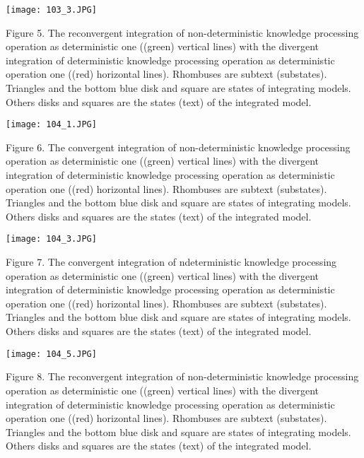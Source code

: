 \documentclass{article}
\begin{document}
\begin{multicols}{2}
\begin{center}
\texttt{[image: 103\_3.JPG]}
\end{center}

\scriptsize Figure 5. The reconvergent integration of non-deterministic knowledge
processing operation as deterministic one ((green) vertical lines) with the
divergent integration of deterministic knowledge processing operation
as deterministic operation one ((red) horizontal lines). Rhombuses are
subtext (substates). Triangles and the bottom blue disk and square are
states of integrating models. Others disks and squares are the states
(text) of the integrated model.


\begin{center}
\texttt{[image: 104\_1.JPG]} 
\end{center}
\vspace{0.5pt}
\scriptsize Figure 6. The convergent integration of non-deterministic knowledge
processing operation as deterministic one ((green) vertical lines) with the
divergent integration of deterministic knowledge processing operation
as deterministic operation one ((red) horizontal lines). Rhombuses are
subtext (substates). Triangles and the bottom blue disk and square are
states of integrating models. Others disks and squares are the states
(text) of the integrated model.

\begin{center}
\texttt{[image: 104\_3.JPG]}
\end{center}
\vspace{0.5pt}
\scriptsize Figure 7. The convergent integration of ndeterministic knowledge
processing operation as deterministic one ((green) vertical lines) with the
divergent integration of deterministic knowledge processing operation
as deterministic operation one ((red) horizontal lines). Rhombuses are
subtext (substates). Triangles and the bottom blue disk and square are
states of integrating models. Others disks and squares are the states
(text) of the integrated model.

\begin{center}
\texttt{[image: 104\_5.JPG]}
\end{center}
\vspace{0.5pt}
\scriptsize Figure 8. The reconvergent integration of non-deterministic knowledge
processing operation as deterministic one ((green) vertical lines) with the
divergent integration of deterministic knowledge processing operation
as deterministic operation one ((red) horizontal lines). Rhombuses are
subtext (substates). Triangles and the bottom blue disk and square are
states of integrating models. Others disks and squares are the states
(text) of the integrated model.


\end{multicols}
\end{document}
